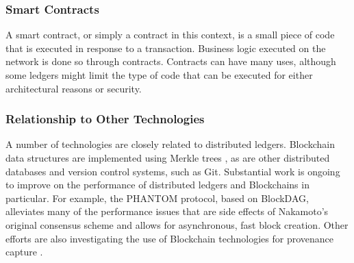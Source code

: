 \subsubsection{Smart Contracts}
A smart contract, or simply a contract in this context, is a small piece of code
that is executed in response to a transaction. Business logic executed on the
network is done so through contracts. Contracts can have many uses, although
some ledgers might limit the type of code that can be executed for either
architectural reasons or security.

\subsubsection{Relationship to Other Technologies}
A number of technologies are closely related to distributed ledgers.
Blockchain data structures are implemented using Merkle trees
\cite{merkle_digital_1987}, as are other distributed databases and version
control systems, such as Git. Substantial work is ongoing to improve
on the performance of distributed ledgers and Blockchains in particular. For
example, the PHANTOM protocol, based on BlockDAG, alleviates many of the
performance issues that are side effects of Nakamoto's original consensus
scheme and allows for asynchronous, fast block creation. Other efforts are also
investigating the use of Blockchain technologies for provenance capture
\cite{richard_brooks_and_anthony_skjellum_using_2017}\cite{worley_2018}.

